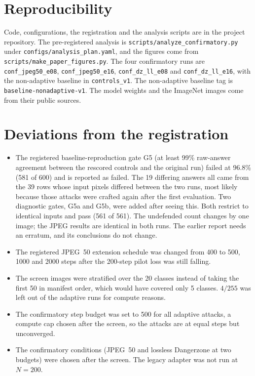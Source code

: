 \documentclass[11pt]{article}
\begin{document}
\section*{Reproducibility}
\begin{sloppypar}
Code, configurations, the registration and the analysis scripts are in the project
repository. The pre-registered analysis is \texttt{scripts/analyze\_confirmatory.py}
under \texttt{configs/analysis\_plan.yaml}, and the figures come from
\texttt{scripts/make\_paper\_figures.py}. The four confirmatory runs are
\texttt{conf\_jpeg50\_e08}, \texttt{conf\_jpeg50\_e16}, \texttt{conf\_dz\_ll\_e08} and
\texttt{conf\_dz\_ll\_e16}, with the non-adaptive baseline in \texttt{controls\_v1}. The
non-adaptive baseline tag is \texttt{baseline-nonadaptive-v1}. The model weights and the
ImageNet images come from their public sources.
\end{sloppypar}

\appendix
\section{Deviations from the registration}
\label{app:dev}

\begin{itemize}
\item The registered baseline-reproduction gate G5 (at least 99\% raw-answer agreement
between the rescored controls and the original run) failed at 96.8\% (581 of 600) and is
reported as failed. The 19 differing answers all came from the 39 rows whose input pixels
differed between the two runs, most likely because those attacks were crafted again after
the first evaluation. Two diagnostic gates, G5a and G5b, were added after seeing this. Both
restrict to identical inputs and pass (561 of 561). The undefended count changes by one
image; the JPEG results are identical in both runs. The earlier report needs an erratum, and
its conclusions do not change.
\item The registered JPEG~50 extension schedule was changed from 400 to 500, 1000 and 2000
steps after the 200-step pilot loss was still falling.
\item The screen images were stratified over the 20 classes instead of taking the first 50 in
manifest order, which would have covered only 5 classes. $4/255$ was left out of the adaptive
runs for compute reasons.
\item The confirmatory step budget was set to 500 for all adaptive attacks, a compute cap
chosen after the screen, so the attacks are at equal steps but unconverged.
\item The confirmatory conditions (JPEG~50 and lossless Dangerzone at two budgets) were chosen
after the screen. The legacy adapter was not run at $N=200$.
\end{itemize}

\printbibliography
\end{document}
